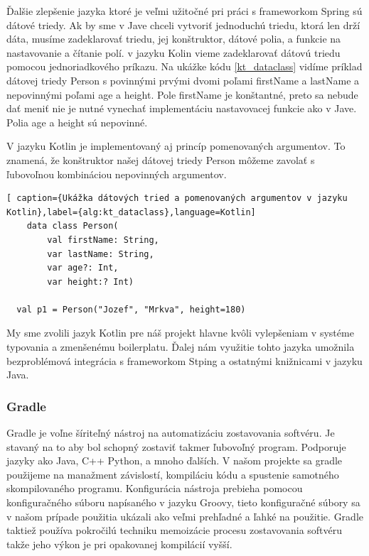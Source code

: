 Ďalšie zlepšenie jazyka ktoré je veľmi užitočné pri práci s frameworkom Spring sú dátové triedy. Ak by sme v Jave chceli vytvoriť jednoduchú triedu, ktorá len drží dáta, musíme zadeklarovať triedu, jej konštruktor, dátové polia, a funkcie na nastavovanie a čítanie polí. v jazyku Kolin vieme zadeklarovať dátovú triedu pomocou jednoriadkového príkazu. Na ukážke kódu \ref{kt_dataclass} vidíme príklad dátovej triedy Person s povinnými prvými dvomi poľami firstName a lastName a nepovinnými poľami age a height. Pole firstName je konštantné, preto sa nebude dať meniť nie je nutné vynechať implementáciu nastavovacej funkcie ako v Jave. Polia age a height sú nepovinné.  
 
V jazyku Kotlin je implementovaný aj princíp pomenovaných argumentov. To znamená, že konštruktor našej dátovej triedy Person môžeme zavolať s ľubovoľnou kombináciou nepovinných argumentov. 

\begin{lstlisting}[ caption={Ukážka dátových tried a pomenovaných argumentov v jazyku Kotlin},label={alg:kt_dataclass},language=Kotlin]
	data class Person(
		val firstName: String,
		var lastName: String,
		var age?: Int,
		var height:? Int)

  val p1 = Person("Jozef", "Mrkva", height=180)		
	\end{lstlisting}



My sme zvolili jazyk Kotlin pre náš projekt hlavne kvôli vylepšeniam v systéme typovania a zmenšenému boilerplatu. Ďalej nám využitie tohto jazyka umožnila bezproblémová integrácia s frameworkom Stping a ostatnými knižnicami v jazyku Java.	

\subsubsection{Gradle}
Gradle je voľne šíriteľný nástroj na automatizáciu zostavovania softvéru. Je stavaný na to aby bol schopný zostaviť takmer ľubovoľný program. Podporuje jazyky ako Java, C++ Python, a mnoho ďalších. V našom projekte sa gradle použijeme na manažment závislostí, kompiláciu kódu a spustenie samotného skompilovaného programu. Konfigurácia nástroja prebieha pomocou konfiguračného súboru napísaného v jazyku Groovy, tieto konfiguračné  súbory sa v našom prípade použitia ukázali ako veľmi prehľadné a ľahké na použitie. Gradle taktiež používa pokročilú techniku memoizácie procesu zostavovania softvéru takže jeho výkon je pri opakovanej kompilácií vyšší.

